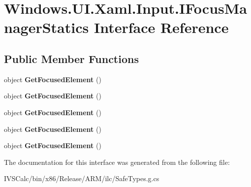 \hypertarget{interface_windows_1_1_u_i_1_1_xaml_1_1_input_1_1_i_focus_manager_statics}{}\section{Windows.\+U\+I.\+Xaml.\+Input.\+I\+Focus\+Manager\+Statics Interface Reference}
\label{interface_windows_1_1_u_i_1_1_xaml_1_1_input_1_1_i_focus_manager_statics}
\subsection*{Public Member Functions}
\begin{DoxyCompactItemize}
\item 
\mbox{\label{interface_windows_1_1_u_i_1_1_xaml_1_1_input_1_1_i_focus_manager_statics_a9cb19a27cf4700a6af68a8f792cbb148}} 
object {\bfseries Get\+Focused\+Element} ()
\item 
\mbox{\label{interface_windows_1_1_u_i_1_1_xaml_1_1_input_1_1_i_focus_manager_statics_a9cb19a27cf4700a6af68a8f792cbb148}} 
object {\bfseries Get\+Focused\+Element} ()
\item 
\mbox{\label{interface_windows_1_1_u_i_1_1_xaml_1_1_input_1_1_i_focus_manager_statics_a9cb19a27cf4700a6af68a8f792cbb148}} 
object {\bfseries Get\+Focused\+Element} ()
\item 
\mbox{\label{interface_windows_1_1_u_i_1_1_xaml_1_1_input_1_1_i_focus_manager_statics_a9cb19a27cf4700a6af68a8f792cbb148}} 
object {\bfseries Get\+Focused\+Element} ()
\item 
\mbox{\label{interface_windows_1_1_u_i_1_1_xaml_1_1_input_1_1_i_focus_manager_statics_a9cb19a27cf4700a6af68a8f792cbb148}} 
object {\bfseries Get\+Focused\+Element} ()
\end{DoxyCompactItemize}


The documentation for this interface was generated from the following file\+:\begin{DoxyCompactItemize}
\item 
I\+V\+S\+Calc/bin/x86/\+Release/\+A\+R\+M/ilc/Safe\+Types.\+g.\+cs\end{DoxyCompactItemize}

